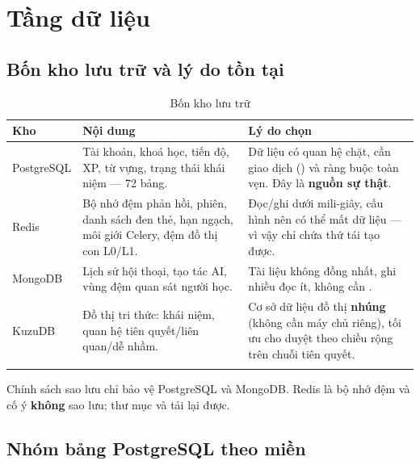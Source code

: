 \chapter{Tầng dữ liệu}

\section{Bốn kho lưu trữ và lý do tồn tại}

\begin{longtable}{L{2.6cm} L{4.0cm} L{7.0cm}}
\toprule
\textbf{Kho} & \textbf{Nội dung} & \textbf{Lý do chọn}\\
\midrule
\endhead
PostgreSQL & Tài khoản, khoá học, tiến độ, XP, từ vựng, trạng thái khái niệm — 72 bảng. &
Dữ liệu có quan hệ chặt, cần giao dịch () và ràng buộc toàn vẹn. Đây là \textbf{nguồn sự thật}.\\
Redis & Bộ nhớ đệm phản hồi, phiên, danh sách đen thẻ, hạn ngạch, môi giới Celery, đệm đồ thị con L0/L1. &
Đọc/ghi dưới mili-giây, cấu hình  nên có thể mất dữ liệu — vì vậy chỉ chứa thứ tái tạo được.\\
MongoDB & Lịch sử hội thoại, tạo tác AI, vùng đệm quan sát người học. &
Tài liệu không đồng nhất, ghi nhiều đọc ít, không cần .\\
KuzuDB & Đồ thị tri thức: khái niệm, quan hệ tiên quyết/liên quan/dễ nhầm. &
Cơ sở dữ liệu đồ thị \textbf{nhúng} (không cần máy chủ riêng), tối ưu cho duyệt theo chiều rộng trên chuỗi tiên quyết.\\
\bottomrule
\caption{Bốn kho lưu trữ}
\end{longtable}

\begin{luuy}
Chính sách sao lưu chỉ bảo vệ PostgreSQL và MongoDB. Redis là bộ nhớ đệm và cố ý
\textbf{không} sao lưu; thư mục  và  tải lại được.
\end{luuy}

\section{Nhóm bảng PostgreSQL theo miền}

